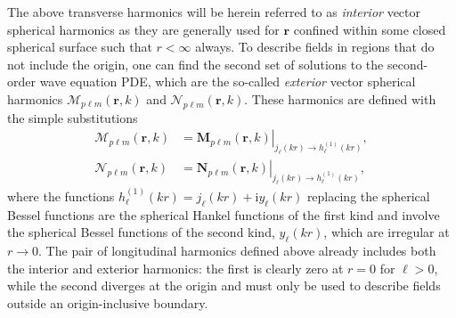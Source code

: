 \documentclass{article}
\numberwithin{equation}{section}
\begin{document}
The above transverse harmonics will be herein referred to as \textit{interior} vector spherical harmonics as they are generally used for $\mathbf{r}$ confined within some closed spherical surface such that $r<\infty$ always. To describe fields in regions that do not include the origin, one can find the second set of solutions to the second-order wave equation PDE, which are the so-called \textit{exterior} vector spherical harmonics $\bm{\mathcal{M}}_{p\ell m}(\mathbf{r},k)$ and $\bm{\mathcal{N}}_{p\ell m}(\mathbf{r},k)$. These harmonics are defined with the simple substitutions
\begin{equation}
\begin{split}
\bm{\mathcal{M}}_{p\ell m}(\mathbf{r},k) &= \left.\mathbf{M}_{p\ell m}(\mathbf{r},k)\right|_{j_\ell(kr)\to h_\ell^{(1)}(kr)},\\
\bm{\mathcal{N}}_{p\ell m}(\mathbf{r},k) &= \left.\mathbf{N}_{p\ell m}(\mathbf{r},k)\right|_{j_\ell(kr)\to h_\ell^{(1)}(kr)},
\end{split}
\end{equation}
where the functions $h_\ell^{(1)}(kr) = j_\ell(kr) + \mathrm{i}y_\ell(kr)$ replacing the spherical Bessel functions are the spherical Hankel functions of the first kind and involve the spherical Bessel functions of the second kind, $y_\ell(kr)$, which are irregular at $r\to0$. The pair of longitudinal harmonics defined above already includes both the interior and exterior harmonics: the first is clearly zero at $r = 0$ for $\ell > 0$, while the second diverges at the origin and must only be used to describe fields outside an origin-inclusive boundary.
\end{document}
